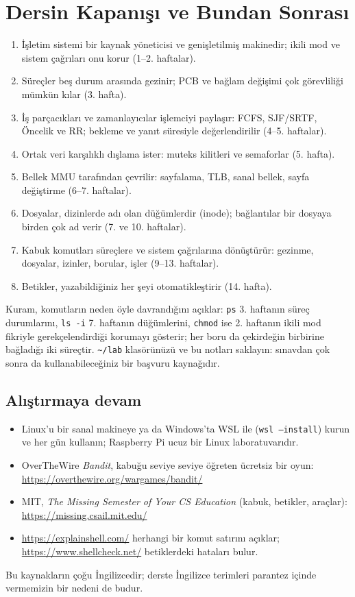 \documentclass[11pt,a4paper]{article}
\newcommand{\cmd}[1]{\texttt{#1}}
\begin{document}
\section{Dersin Kapanışı ve Bundan Sonrası}

\begin{keyidea}
\begin{enumerate}[leftmargin=1.4em]
  \item İşletim sistemi bir kaynak yöneticisi ve genişletilmiş makinedir; ikili mod ve sistem çağrıları onu korur (1--2. haftalar).
  \item Süreçler beş durum arasında gezinir; PCB ve bağlam değişimi çok görevliliği mümkün kılar (3. hafta).
  \item İş parçacıkları ve zamanlayıcılar işlemciyi paylaşır: FCFS, SJF/SRTF, Öncelik ve RR; bekleme ve yanıt süresiyle değerlendirilir (4--5. haftalar).
  \item Ortak veri karşılıklı dışlama ister: muteks kilitleri ve semaforlar (5. hafta).
  \item Bellek MMU tarafından çevrilir: sayfalama, TLB, sanal bellek, sayfa değiştirme (6--7. haftalar).
  \item Dosyalar, dizinlerde adı olan düğümlerdir (inode); bağlantılar bir dosyaya birden çok ad verir (7. ve 10. haftalar).
  \item Kabuk komutları süreçlere ve sistem çağrılarına dönüştürür: gezinme, dosyalar, izinler, borular, işler (9--13. haftalar).
  \item Betikler, yazabildiğiniz her şeyi otomatikleştirir (14. hafta).
\end{enumerate}
\end{keyidea}

Kuram, komutların neden öyle davrandığını açıklar: \cmd{ps} 3. haftanın süreç durumlarını, \cmd{ls -i} 7. haftanın düğümlerini, \cmd{chmod} ise 2. haftanın ikili mod fikriyle gerekçelendirdiği korumayı gösterir; her boru da çekirdeğin birbirine bağladığı iki süreçtir. \texttt{\textasciitilde/lab} klasörünüzü ve bu notları saklayın: sınavdan çok sonra da kullanabileceğiniz bir başvuru kaynağıdır.

\subsection*{Alıştırmaya devam}
\begin{itemize}
  \item Linux'u bir sanal makineye ya da Windows'ta WSL ile (\cmd{wsl --install}) kurun ve her gün kullanın; Raspberry Pi ucuz bir Linux laboratuvarıdır.
  \item OverTheWire \emph{Bandit}, kabuğu seviye seviye öğreten ücretsiz bir oyun: \url{https://overthewire.org/wargames/bandit/}
  \item MIT, \emph{The Missing Semester of Your CS Education} (kabuk, betikler, araçlar): \url{https://missing.csail.mit.edu/}
  \item \url{https://explainshell.com/} herhangi bir komut satırını açıklar; \url{https://www.shellcheck.net/} betiklerdeki hataları bulur.
\end{itemize}
Bu kaynakların çoğu İngilizcedir; derste İngilizce terimleri parantez içinde vermemizin bir nedeni de budur.
\end{document}
